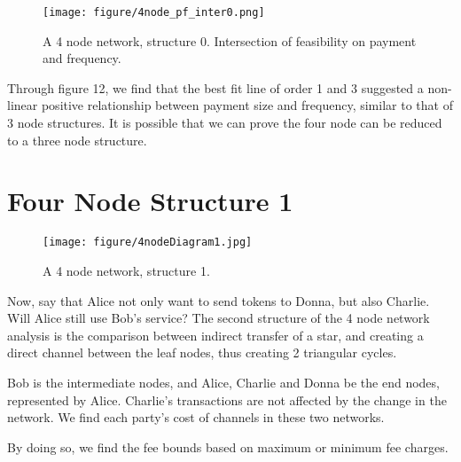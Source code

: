 \documentclass[twocolumn,10pt]{report}
\begin{document}
\begin{figure}[t]
    \begin{center}
    \setlength{\unitlength}{0.012500in}%
    \texttt{[image: figure/4node\_pf\_inter0.png]}
    \end{center}
    \caption{A 4 node network, structure 0. Intersection of feasibility on payment and frequency.}
    \label{figure_4Node3} 
    \end{figure}
Through figure 12, we find that the best fit line of order 1 and 3 suggested a non-linear positive relationship between payment size and frequency, similar to that of 3 node structures. It is possible that we can prove the four node can be reduced to a three node structure. 




\section{Four Node Structure 1}
\begin{figure}[t]
    \begin{center}
    \setlength{\unitlength}{0.012500in}%
    \texttt{[image: figure/4nodeDiagram1.jpg]}
    \end{center}
    \caption{A 4 node network, structure 1.}
    \label{figure_4Node4} 
    \end{figure}

Now, say that Alice not only want to send tokens to Donna, but also Charlie. Will Alice still use Bob's service? The second structure of the 4 node network analysis is the comparison between indirect transfer of a star, and creating a direct channel between the leaf nodes, thus creating 2 triangular cycles. 

Bob is the intermediate nodes, and Alice, Charlie and Donna be the end nodes, represented by Alice. Charlie's transactions are not affected by the change in the network. We find each party's cost of channels in these two networks. 

By doing so, we find the fee bounds based on maximum or minimum fee charges. 
\end{document}
